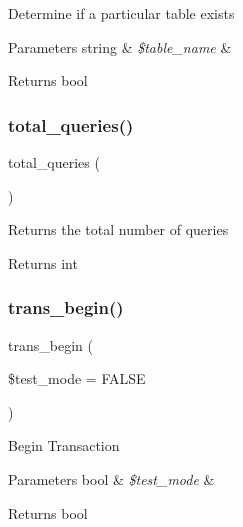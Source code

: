 Determine if a particular table exists


\begin{DoxyParams}[1]{Parameters}
string & {\em \$table\+\_\+name} & \\
\hline
\end{DoxyParams}
\begin{DoxyReturn}{Returns}
bool 
\end{DoxyReturn}
\mbox{\label{class_c_i___d_b__driver_a8fc0b6551e1ca0c68c6e3a66b27310fc}} 
\subsubsection{\texorpdfstring{total\+\_\+queries()}{total\_queries()}}
{\footnotesize\ttfamily total\+\_\+queries (\begin{DoxyParamCaption}{ }\end{DoxyParamCaption})}

Returns the total number of queries

\begin{DoxyReturn}{Returns}
int 
\end{DoxyReturn}
\mbox{\label{class_c_i___d_b__driver_a90e153cf190d273336d77cce930587e1}} 
\subsubsection{\texorpdfstring{trans\+\_\+begin()}{trans\_begin()}}
{\footnotesize\ttfamily trans\+\_\+begin (\begin{DoxyParamCaption}\item[{}]{\$test\+\_\+mode = {\ttfamily FALSE} }\end{DoxyParamCaption})}

Begin Transaction


\begin{DoxyParams}[1]{Parameters}
bool & {\em \$test\+\_\+mode} & \\
\hline
\end{DoxyParams}
\begin{DoxyReturn}{Returns}
bool 
\end{DoxyReturn}
\mbox{\label{class_c_i___d_b__driver_af4fbdcdace4aa94a139b64877601fe9b}} 
